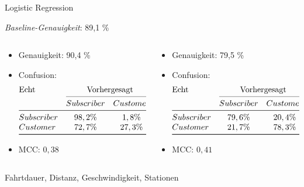 \begin{frame}{Logistic Regression}

\emph{Baseline-Genauigkeit}: 89,1 \%

\begin{columns}
\begin{column}{0.5\textwidth}
{
\begin{itemize}
\item Genauigkeit: 90,4 \%
\item Confusion:
\[
\begin{array}{@{}l*{5}{c}@{}}
\text{Echt} & \multicolumn{2}{c@{}}{\text{Vorhergesagt}}\\
    \cmidrule(l){2-3}
    & Subscriber & Customer\\
\midrule
Subscriber & 98,2\% & 1,8 \% \\
Customer   & 72,7 \% & 27,3 \% \\
\bottomrule
\end{array}
\]
\item MCC: $0,38$
\end{itemize}
}
\end{column}
\begin{column}{0.5\textwidth}
{
\begin{itemize}
\item Genauigkeit: 79,5 \%
\item Confusion:
\[
\begin{array}{@{}l*{5}{c}@{}}
\text{Echt} & \multicolumn{2}{c@{}}{\text{Vorhergesagt}}\\
    \cmidrule(l){2-3}
    & Subscriber & Customer\\
\midrule
Subscriber & 79,6\% & 20,4 \% \\
Customer   & 21,7 \% & 78,3 \% \\
\bottomrule
\end{array}
\]
\item MCC: $0,41$
\end{itemize}
}
\end{column}
\end{columns}

{
Fahrtdauer, Distanz, Geschwindigkeit, Stationen
}
\end{frame}


